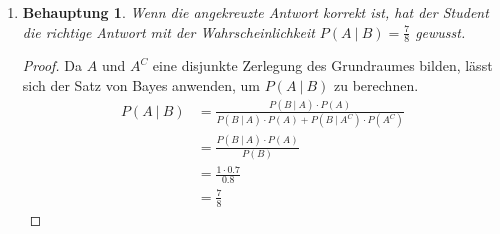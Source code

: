 \documentclass[a4paper]{scrartcl}
\newtheorem*{behaupt}{Behauptung}
\begin{document}
\begin{enumerate}[label=\bfseries\arabic*.]
\begin{enumerate}[label=(\alph*)]
            \item
                \begin{behaupt}
                    Wenn die angekreuzte Antwort korrekt ist, hat der Student
                    die richtige Antwort mit der Wahrscheinlichkeit
                    $P(A\ |\ B) = \frac{7}{8}$ gewusst.
                \end{behaupt}
                \begin{proof}
                    Da $A$ und $A^C$ eine disjunkte Zerlegung des
                    Grundraumes bilden, lässt sich der Satz von Bayes anwenden,
                    um $P(A\ |\ B)$ zu berechnen.
                    \begin{equation*}
                        \begin{split}
                            P(A\ |\ B) &= \frac{P(B\ |\ A) \cdot P(A)}
                            {P(B\ |\ A) \cdot P(A) + P(B\ |\ A^C) \cdot P(A^C)}
                            \\
                            &= \frac{P(B\ |\ A) \cdot P(A)}{P(B)} \\
                            &= \frac{1 \cdot \num{0.7}}{\num{0.8}} \\
                            &= \frac{7}{8}
                        \end{split}
                    \end{equation*}
                \end{proof}

        \end{enumerate}


\end{enumerate}
\end{document}
